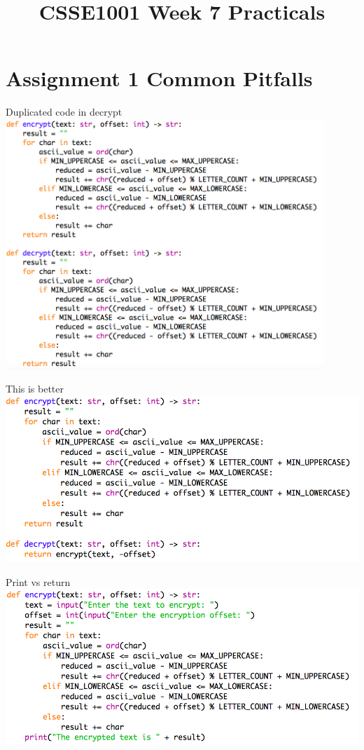 \documentclass[week2]{csse1001}
\title{CSSE1001 Week 7 Practicals}
\begin{document}
\begin{frame} 
\maketitle
\end{frame}

\section{Assignment 1 Common Pitfalls}

\begin{topic}{Duplicated code in decrypt}
\includegraphics[width=0.9\textwidth]{a1pitfalls/baddecrypt}
\end{topic}

\begin{topic}{This is better}
\includegraphics[width=\textwidth]{a1pitfalls/gooddecrypt}
\end{topic}

\begin{topic}{Print vs return}
\includegraphics[width=\textwidth]{a1pitfalls/pvr}
\end{topic}
\end{document}
